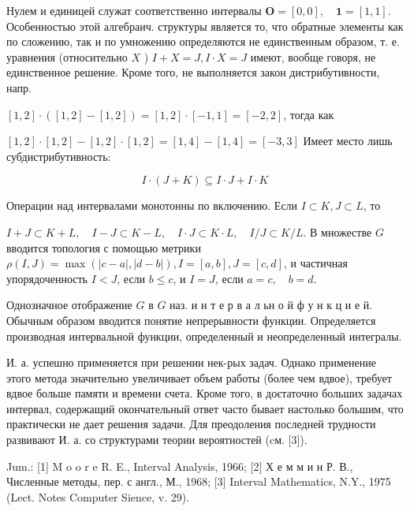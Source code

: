 \documentclass[10pt]{article}
\begin{document}
Нулем и единицей служат соответственно интервалы $\mathbf{O}=[0,0], \quad \mathbf{1}=[1,1]$. Особенностью этой алгебраич. структуры является то, что обратные элементы как по сложению, так и по умножению определяются не единственным образом, т. е. уравнения (относительно $X$ ) $I+X=J, I \cdot X=J$ имеют, вообще говоря, не единственное решение. Кроме того, не выполняется закон дистрибутивности, напр.



$[1,2] \cdot([1,2]-[1,2])=[1,2] \cdot[-1,1]=[-2,2]$, тогда как



$[1,2] \cdot[1,2]-[1,2] \cdot[1,2]=[1,4]-[1,4]=[-3,3]$ Имеет место лишь субдистрибутивность:



\[

I \cdot(J+K) \subseteq I \cdot J+I \cdot K

\]



Операции над интервалами монотонны по включению. Если $I \subset K, J \subset L$, то



$I+J \subset K+L, \quad I-J \subset K-L, \quad I \cdot J \subset K \cdot L, \quad I / J \subset K / L$. В множестве $G$ вводится топология с помощью метрики $\rho(I, J)=\max (|c-a|,|d-b|), I=[a, b], J=[c, d]$, и частичная упорядоченность $I<J$, если $b \leqslant c$, и $I=J$, если $a=c, \quad b=d$.



Однозначное отображение $G$ в $G$ наз. и н т е р в а л ьн о й ф у н к ц и е й. Обычным образом вводится понятие непрерывности функции. Определяется производная интервальной функции, определенный и неопределенный интегралы.



И. а. успешно применяется при решении нек-рых задач. Однако применение этого метода значительно увеличивает объем работы (более чем вдвое), требует вдвое больше памяти и времени счета. Кроме того, в доєтаточно больших задачах интервал, содержащий окончательный ответ часто бывает настолько большим, что практически не дает решения задачи. Для преодоления последней трудности развивают И. а. со структурами теории вероятностей (cм. [3]).



Jum.: [1] M o o r e R. E., Interval Analysis, 1966; [2] Х е м м и н Р. В., Численные методы, пер. с англ., М., 1968; [3] Interval Mathematics, N.Y., 1975 (Lect. Notes Computer Sience, v. 29).
\end{document}
